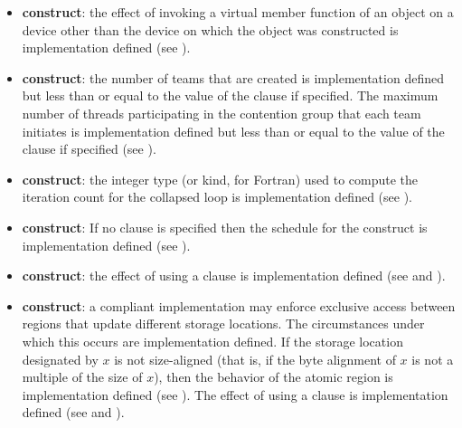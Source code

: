 \begin{itemize}
\item {} \textbf{construct}: the effect of invoking a virtual member
function of an object on a device other than the device on which the object was
constructed is implementation defined (see ).

\item {} \textbf{construct}: the number of teams that are created is implementation defined but
less than or equal to the value of the  clause if specified. The maximum
number of threads participating in the contention group that each team initiates is
implementation defined but less than or equal to the value of the 
clause if specified (see ).

\item {} \textbf{construct}: the integer type (or kind, for
    Fortran) used to compute the iteration count for the collapsed loop is
    implementation defined (see ).

\item {} \textbf{construct}: If no  clause is specified then the schedule for the 
construct is implementation defined (see ).

\item {} \textbf{construct}: the effect of using a 
clause is implementation defined (see  and ).

\item {} \textbf{construct}: a compliant implementation may enforce exclusive access
between  regions that update different storage locations. The circumstances
under which this occurs are implementation defined. If the storage location
designated by $x$ is not size-aligned (that is, if the byte alignment of $x$ is not a multiple
of the size of $x$), then the behavior of the atomic region is implementation defined
(see ).
The effect of using a  clause is implementation defined (see  and ).

\end{itemize}
